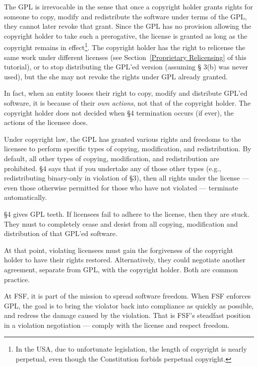 \documentclass[12pt]{report}
\begin{document}
The GPL is irrevocable in the sense that once a copyright holder grants
rights for someone to copy, modify and redistribute the software under
terms of the GPL, they cannot later revoke that grant.  Since the GPL has
no provision allowing the copyright holder to take such a prerogative, the
license is granted as long as the copyright remains in effect\footnote{In
  the USA, due to unfortunate legislation, the length of copyright is
  nearly perpetual, even though the Constitution forbids perpetual
  copyright.}.  The copyright holder has the right to relicense the same
work under different licenses (see Section~\ref{Proprietary Relicensing}
of this tutorial), or to stop distributing the GPL'ed version (assuming \S
3(b) was never used), but the she may not revoke the rights under GPL
already granted.

In fact, when an entity looses their right to copy, modify and distribute
GPL'ed software, it is because of their \emph{own actions}, not that of
the copyright holder.  The copyright holder does not decided when \S 4
termination occurs (if ever), the actions of the licensee does.

Under copyright law, the GPL has granted various rights and freedoms to
the licensee to perform specific types of copying, modification, and
redistribution.  By default, all other types of copying, modification, and
redistribution are prohibited.  \S 4 says that if you undertake any of
those other types (e.g., redistributing binary-only in violation of \S 3),
then all rights under the license --- even those otherwise permitted for
those who have not violated --- terminate automatically.

\S 4 gives GPL teeth.  If licensees fail to adhere to the license, then
they are stuck.  They must to completely cease and desist from all
copying, modification and distribution of that GPL'ed software.

At that point, violating licensees must gain the forgiveness of the
copyright holder to have their rights restored.  Alternatively, they could
negotiate another agreement, separate from GPL, with the copyright
holder.  Both are common practice.

At FSF, it is part of the mission to spread software freedom.  When FSF
enforces GPL, the goal is to bring the violator back into compliance as
quickly as possible, and redress the damage caused by the violation.
That is FSF's steadfast position in a violation negotiation --- comply
with the license and respect freedom.
\end{document}
